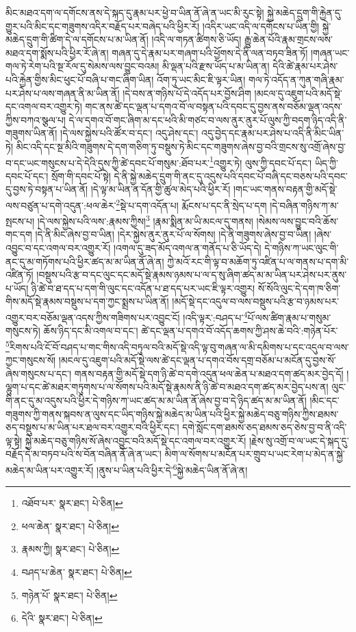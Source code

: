 མིང་མཐའ་དག་ལ་དགོངས་ནས་དེ་སྐད་དུ་རྣམ་པར་ཕྱེ་བ་ཡིན་ནོ་ཞེ་ན་ཡང་མི་རུང་སྟེ། སྐྱེ་མཆེད་དྲུག་གི་རྐྱེན་དུ་གྱུར་པའི་མིང་དང་གཟུགས་འདིར་བརྗོད་པར་བཞེད་པའི་ཕྱིར་རོ། །འདིར་ཡང་འདི་ལ་དགོངས་པ་ཡིན་གྱི། སྐྱེ་མཆེད་དྲུག་གི་ཚིག་དེ་ལ་དགོངས་པ་མ་ཡིན་ནོ། །འདི་ལ་གཏན་ཚིགས་ཅི་ཡོད། རྒྱུ་ཆེན་པོའི་རྣམ་གྲངས་ལས་མཐའ་དག་སྨོས་པའི་ཕྱིར་རོ་ཞེ་ན། གཞན་དུ་དེ་རྣམ་པར་གཞག་པའི་ཕྱོགས་དེ་ནི་ལན་བཏབ་ཟིན་ཏོ། །གཞན་ཡང་གལ་ཏེ་རེག་པའི་སྔ་རོལ་དུ་སེམས་ལས་བྱུང་བའམ། མི་ལྡན་པའི་རྫས་ཡོད་པ་མ་ཡིན་ན། དེའི་ཚེ་རྣམ་པར་ཤེས་པའི་རྐྱེན་གྱིས་མིང་ཕུང་པོ་བཞི་པ་གང་ཞིག་ཡིན། འོག་ཏུ་ཡང་མིང་ཇི་ལྟར་ཡིན། གལ་ཏེ་འདོད་ན་ཀུན་གཞི་རྣམ་པར་ཤེས་པ་ལས་གཞན་ནི་མ་ཡིན་ནོ། །དེ་བས་ན་གཉིས་པོ་དེ་འདོད་པར་བྱོས་ཤིག །མངལ་དུ་འཇུག་པའི་མདོ་སྡེ་དང་འགལ་བར་འགྱུར་ཏེ། གང་ནས་ཚེ་དང་ལྡན་པ་དགའ་བོ་ལ་བསྟན་པའི་དབང་དུ་བྱས་ནས་བཅོམ་ལྡན་འདས་ཀྱིས་བཀའ་སྩལ་པ། དེ་ལ་དགའ་བོ་གང་ཞིག་མ་དང་ཕའི་མི་གཙང་བ་ལས་ནུར་ནུར་པོ་ལུས་ཀྱི་བདག་ཉིད་འདི་ནི་གཟུགས་ཡིན་ནོ། །དེ་ལས་སྐྱེས་པའི་ཚོར་བ་དང་། འདུ་ཤེས་དང་། འདུ་བྱེད་དང་རྣམ་པར་ཤེས་པ་འདི་ནི་མིང་ཡིན་ཏེ། མིང་འདི་དང་སྔ་མིའི་གཟུགས་དེ་དག་གཅིག་ཏུ་བསྡུས་ཏེ་མིང་དང་གཟུགས་ཞེས་བྱ་བའི་གྲངས་སུ་འགྲོ་ཞེས་བྱ་བ་དང་ཡང་གསུངས་པ་དེ་དེའི་དུས་ཀྱི་ཚེ་དབང་པོ་གསུམ་:ཐོབ་པར་\footnote{འཐོབ་པར་  སྣར་ཐང་།  པེ་ཅིན། }འགྱུར་ཏེ། ལུས་ཀྱི་དབང་པོ་དང་། ཡིད་ཀྱི་དབང་པོ་དང་། སྲོག་གི་དབང་པོ་སྟེ། དེ་ནི་སྐྱེ་མཆེད་དྲུག་གི་ནང་དུ་འདུས་པའི་དབང་པོ་བཞི་དང་བཅས་པའི་དབང་དུ་བྱས་ཏེ་བསྟན་པ་ཡིན་ནོ། །དེ་ལྟ་མ་ཡིན་ན་དོན་གྱི་ཚུལ་མེད་པའི་ཕྱིར་རོ། །གང་ཡང་གནས་བརྟན་གྱི་མདོ་སྡེ་ལས་བཙུན་པ་དགེ་འདུན་:ཕལ་ཆེར་\footnote{ཕལ་ཆེན་  སྣར་ཐང་།  པེ་ཅིན། }སྡེ་པ་དག་འདོན་པ། རྨོངས་པ་དང་ནི་སྲེད་པ་དག །དེ་བཞིན་གཉིས་ཀ་མ་སྤངས་པ། །དེ་ལས་སྐྱེས་པའི་ལས་:རྣམས་ཀྱིས།\footnote{རྣམས་ཀྱི།  སྣར་ཐང་།  པེ་ཅིན། } །རྣམ་སྨིན་མ་ཡི་མངལ་དུ་གནས། །སེམས་ལས་བྱུང་བའི་ཆོས་གང་དག །དེ་ནི་མིང་ཞེས་བྱ་བ་ཡིན། །དེར་སྐྱེས་ནུར་ནུར་པོ་ལ་སོགས། །དེ་ནི་གཟུགས་ཞེས་བྱ་བ་ཡིན། །ཞེས་འབྱུང་བ་དང་འགལ་བར་འགྱུར་རོ། །འགལ་དུ་ཟད་མོད་འགལ་ན་གནོད་པ་ཅི་ཡོད་དེ། དེ་གཉིས་ཀ་ཡང་ལུང་གི་ནང་དུ་མ་གཏོགས་པའི་ཕྱིར་ཚད་མ་མ་ཡིན་ནོ་ཞེ་ན། ཀྱེ་མའོ་རང་གི་ལྟ་བ་མཆོག་ཏུ་འཛིན་པ་ལ་གནས་པ་དག་མི་འཛིན་ཏོ། །བསྡུས་པའི་རྩ་བ་དང་ལུང་དང་མདོ་སྡེ་རྣམས་ཉམས་པ་ལ་ད་སུ་ཞིག་ཚད་མ་མ་ཡིན་པར་ཤེས་པར་ནུས་པ་ཡོད། ཉི་ཚེ་བ་ཐ་དད་པ་དག་གི་ལུང་དང་འདོན་པ་ཐ་དད་པར་ཡང་ཇི་ལྟར་འགྱུར། སོ་སོའི་ལུང་དེ་དག་ཁ་ཅིག་གིས་མདོ་སྡེ་རྣམས་བསྡུས་པ་དག་ཀྱང་སྨྲས་པ་ཡིན་ནོ། །མདོ་སྡེ་དང་འདུལ་བ་ལས་བསྡུས་པའི་རྩ་བ་ཉམས་པར་འགྱུར་བར་བཅོམ་ལྡན་འདས་ཀྱིས་གཟིགས་པར་འབྱུང་ངོ། །འདི་ལྟར་:བཤད་པ་\footnote{བཤད་པ་ཆེན་  སྣར་ཐང་།  པེ་ཅིན། }པོ་ལས་ཚིག་རྣམ་པ་གསུམ་གསུངས་ཏེ། ཆོས་ཉིད་དང་མི་འགལ་བ་དང་། ཚེ་དང་ལྡན་པ་དགའ་བོ་འདོད་ཆགས་ཀྱི་ཤས་ཆེ་བའི་:གཉེན་པོར་\footnote{གཉེན་པོ་  སྣར་ཐང་།  པེ་ཅིན། }རིགས་པའི་ངོ་བོ་བཤད་པ་གང་གིས་འདི་བཏུལ་བའི་མདོ་སྡེ་འདི་ལྟ་བུ་གཞན་ལ་མི་དམིགས་པ་དང་འདུལ་བ་ལས་ཀྱང་གསུངས་སོ། །མངལ་དུ་འཇུག་པའི་མདོ་སྡེ་ལས་ཚེ་དང་ལྡན་པ་དགའ་བོས་དགྲ་བཅོམ་པ་མངོན་དུ་བྱས་སོ་ཞེས་གསུངས་པ་དང་། གནས་བརྟན་གྱི་མདོ་སྡེ་དག་ཉི་ཚེ་བ་དགེ་འདུན་ཕལ་ཆེན་པ་མཐའ་དག་ཚད་མར་བྱེད་དོ། །ལྷུག་པ་དང་ཚེ་མཐར་གཏུགས་པ་ལ་སོགས་པའི་མདོ་སྡེ་རྣམས་ནི་ཉི་ཚེ་བ་མཐའ་དག་ཚད་མར་བྱེད་པས་ན། ལུང་གི་ནང་དུ་མ་འདུས་པའི་ཕྱིར་དེ་གཉིས་ཀ་ཡང་ཚད་མ་མ་ཡིན་ནོ་ཞེས་བྱ་བ་དེ་ཉིད་ཚད་མ་མ་ཡིན་ནོ། །མིང་དང་གཟུགས་ཀྱི་གནས་སྐབས་ན་ལུས་དང་ཡིད་གཉིས་སྐྱེ་མཆེད་མ་ཡིན་པའི་ཕྱིར་སྐྱེ་མཆེད་བཅུ་གཉིས་ཀྱིས་ཐམས་ཅད་བསྡུས་པ་མ་ཡིན་པར་ཐལ་བར་འགྱུར་བའི་ཕྱིར་དང་། དགེ་སློང་དག་ཐམས་ཅད་ཐམས་ཅད་ཅེས་བྱ་བ་ནི་འདི་ལྟ་སྟེ། སྐྱེ་མཆེད་བཅུ་གཉིས་སོ་ཞེས་འབྱུང་བའི་མདོ་སྡེ་དང་འགལ་བར་འགྱུར་རོ། །རྗེས་སུ་འགྲོ་བ་ལ་ཡང་དེ་སྐད་དུ་བརྗོད་དེ་མ་བཏབ་པའི་ས་བོན་བཞིན་ནོ་ཞེ་ན་ཡང་། མིག་ལ་སོགས་པ་མངོན་པར་གྲུབ་པ་ཡང་རེག་པ་མེད་ན་སྐྱེ་མཆེད་མ་ཡིན་པར་འགྱུར་རོ། །ནུས་པ་ཡིན་པའི་ཕྱིར་དེ་\footnote{དེའི་  སྣར་ཐང་།  པེ་ཅིན། }སྐྱེ་མཆེད་ཡིན་ནོ་ཞེ་ན། 